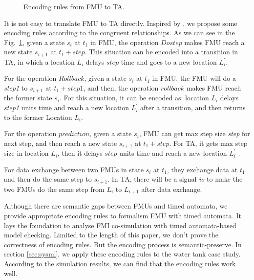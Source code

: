 \begin{figure}[htbp]
	\caption{Encoding rules from FMU to TA.}
	\label{fmutota}
\end{figure}

It is not easy to translate FMU to TA directly. Inspired by \cite{Tripakis15}, we propose some encoding rules according to the congruent relationships. As we can see in the Fig.~\ref{fmutota}, given a state $s_{i}$ at $t_{1}$ in FMU, the operation $Dostep$ makes FMU reach a new state $s_{i+1}$ at $t_{1}+step$. This situation can be encoded into a transition in TA, in which a location $L_{i}$ delays $step$ time and goes to a new location $L_{i}^{\prime}$.

For the operation $Rollback$, given a state $s_{i}$ at $t_{1}$ in FMU, the FMU will do a \emph{step1} to $s_{i+1}$ at $t_{1}+step1$, and then, the operation $rollback$ makes FMU reach the former state $s_{i}$. For this situation, it can be encoded as: location $L_{i}$ delays \emph{step1} units time and reach a new location $L_{i}^{\prime}$ after a transition, and then returns to the former Location $L_{i}$. 

For the operation $prediction$, given a state $s_{i}$, FMU can get max step size \emph{step} for next step, and then reach a new state $s_{i+1}$ at $t_{1}+step$. For TA, it gets max step size in location $L_{i}$, then it delays $step$ units time and reach a new location $L_{i}^{\prime}$ .

For data exchange between two FMUs in state $s_{i}$ at $t_{1}$, they exchange data at $t_{1}$ and then do the same step to $s_{i+1}$. In TA, there will be a signal \emph{io} to make the two FMUs do the same step from $L_{i}$ to $L_{i+1}$ after data exchange.

Although there are semantic gaps between FMUs and timed automata, we provide appropriate encoding rules to formalism FMU with timed automata. It lays the foundation to analyse FMI co-simulation with timed automata-based model checking. Limited to the length of this paper, we don't prove the correctness of encoding rules. But the encoding process is semantic-preserve. In section \ref{sec:sysml}, we apply these encoding rules to the water tank case study. According to the simulation results, we can find that the encoding rules work well.